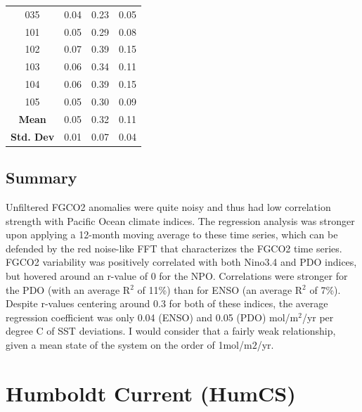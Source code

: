\documentclass[12pt]{article}
\begin{document}
\begin{table}[!h]
\begin{tabular}{c | c c c}
	035 &   0.04 &     0.23 &       0.05 \\
	101 &   0.05 &     0.29 &       0.08 \\
	102 &   0.07 &     0.39 &       0.15 \\
	103 &   0.06 &     0.34 &       0.11 \\
	104 &   0.06 &     0.39 &       0.15 \\
	105 &   0.05 &     0.30 &       0.09 \\
	\bottomrule
	\textbf{Mean} & 0.05 & 0.32 & 0.11 \\
	\textbf{Std. Dev} & 0.01 & 0.07 & 0.04 \\
\end{tabular}
\label{tab:2}
\end{table}
\clearpage
\subsection{Summary}
Unfiltered FGCO2 anomalies were quite noisy and thus had low correlation strength with Pacific Ocean climate indices. The regression analysis was stronger upon applying a 12-month moving average to these time series, which can be defended by the red noise-like FFT that characterizes the FGCO2 time series. FGCO2 variability was positively correlated with both Nino3.4 and PDO indices, but hovered around an r-value of 0 for the NPO. Correlations were stronger for the PDO (with an average R$^{2}$ of 11\%) than for ENSO (an average R$^{2}$ of 7\%). Despite r-values centering around 0.3 for both of these indices, the average regression coefficient was only 0.04 (ENSO) and 0.05 (PDO) mol/m$^{2}$/yr per degree C of SST deviations. I would consider that a fairly weak relationship, given a mean state of the system on the order of 1mol/m${2}$/yr.

\clearpage
\section{Humboldt Current (HumCS)}
\end{document}
